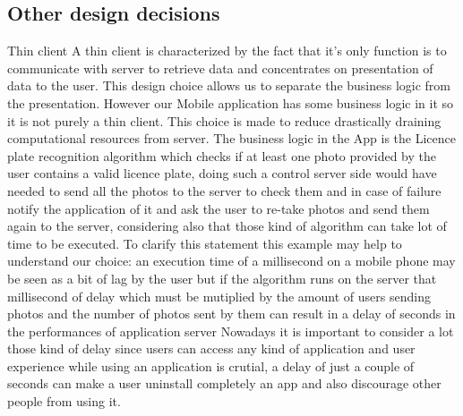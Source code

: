 \subsection{Other design decisions}
Thin client 
\newline
A thin client is characterized by the fact that it's only function is to communicate with server to retrieve data and concentrates on presentation of data to the user.
\newline
This design choice allows us to separate the business logic from the presentation. However our Mobile application has some business logic in it so it is not purely a thin client. This choice is made to reduce drastically draining computational resources from server. The business logic in the App is the Licence plate recognition algorithm which checks if at least one photo provided by the user contains a valid licence plate, doing such a control server side would have needed to send all the photos to the server to check them and in case of failure notify the application of it and ask the user to re-take photos and send them again to the server, considering also that those kind of algorithm can take lot of time to be executed.
To clarify this statement this example may help to understand our choice: an execution time of a millisecond on a mobile phone may be seen as a bit of lag by the user but if the algorithm runs on the server that millisecond of delay which must be mutiplied by the amount of users sending photos and the number of photos sent by them can result in a delay of seconds in the performances of application server
Nowadays it is important to consider a lot those kind of delay since users can access any kind of application and user experience while using an application is crutial, a delay of just a couple of seconds can make a user uninstall completely an app and also discourage other people from using it.










